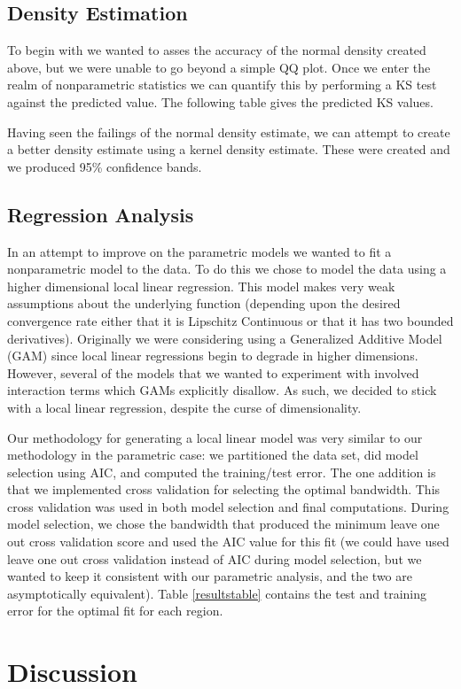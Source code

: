 \documentclass[12pt]{article}
\begin{document}
\subsection{Density Estimation}
To begin with we wanted to asses the accuracy of the normal density created above, but we were unable to go beyond a simple QQ plot. Once we enter the realm of nonparametric statistics we can quantify this by performing a KS test against the predicted value. The following table gives the predicted KS values.

Having seen the failings of the normal density estimate, we can attempt to create a better density estimate using a kernel density estimate. These were created and we produced 95\% confidence bands.
\subsection{Regression Analysis}
In an attempt to improve on the parametric models we wanted to fit a nonparametric model to the data. To do this we chose to model the data using a higher dimensional local linear regression. This model makes very weak assumptions about the underlying function (depending upon the desired convergence rate either that it is Lipschitz Continuous or that it has two bounded derivatives). Originally we were considering using a Generalized Additive Model (GAM) since local linear regressions begin to degrade in higher dimensions. However, several of the models that we wanted to experiment with involved interaction terms which GAMs explicitly disallow. As such, we decided to stick with a local linear regression, despite the curse of dimensionality.

Our methodology for generating a local linear model was very similar to our methodology in the parametric case: we partitioned the data set, did model selection using AIC, and computed the training/test error. The one addition is that we implemented cross validation for selecting the optimal bandwidth. This cross validation was used in both model selection and final computations. During model selection, we chose the bandwidth that produced the minimum leave one out cross validation score and used the AIC value for this fit (we could have used leave one out cross validation instead of AIC during model selection, but we wanted to keep it consistent with our parametric analysis, and the two are asymptotically equivalent). Table \ref{resultstable} contains the test and training error for the optimal fit for each region.
\section{Discussion}
\end{document}
